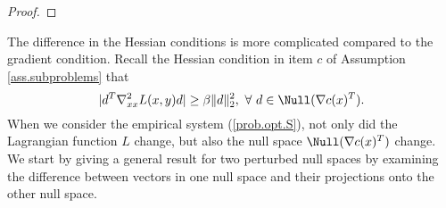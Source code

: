 \begin{proof}
\end{proof}

The difference in the Hessian conditions is more complicated compared to the gradient condition. Recall the Hessian condition in item $c$ of Assumption \ref{ass.subproblems} that
\[
|d^T\nabla^2_{xx}L(x,y)d|\ge\beta\|d\|_2^2,\ \forall\ d\in\Null(\nabla c(x)^T).
\]
When we consider the empirical system (\ref{prob.opt.S}), not only did the Lagrangian function $L$ change, but also the null space $\Null(\nabla c(x)^T)$ change. We start by giving a general result for two perturbed null spaces by examining the difference between vectors in one null space and their projections onto the other null space.

%

